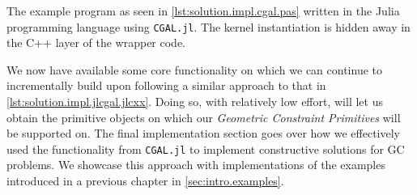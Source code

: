\begin{listing}[htb]
  \inputminted{julia}{jl/points_and_segments.jl}
  \caption[CGAL.jl: Three points and one segment]{
    The example program as seen in \cref{lst:solution.impl.cgal.pas} written in
    the Julia programming language using \texttt{CGAL.jl}.  The kernel
    instantiation is hidden away in the C++ layer of the wrapper code.}%
  \label{lst:solution.impl.jlcgal.pas}
\end{listing}

We now have available some core functionality on which we can continue to
incrementally build upon following a similar approach to that in
\cref{lst:solution.impl.jlcgal.jlcxx}.  Doing so, with relatively low effort,
will let us obtain the primitive objects on which our \textit{Geometric
Constraint Primitives} will be supported on.  The final implementation section
goes over how we effectively used the functionality from \texttt{CGAL.jl} to
implement constructive solutions for \ac{GC} problems.  We showcase this
approach with implementations of the examples introduced in a previous chapter
in \cref{sec:intro.examples}.
